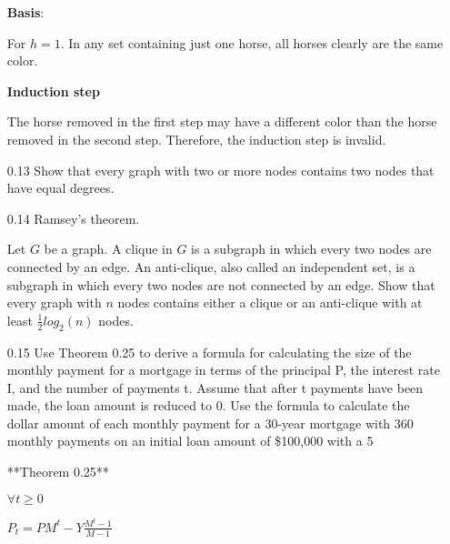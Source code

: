 \documentclass[12pt, a4paper]{article}
\begin{document}
\begin{enumerate}
\textbf{Basis}: 

For $h = 1$. In any set containing just one horse, all horses clearly are the same color.

\textbf{Induction step}

The horse removed in the first step may have a different color than the horse removed in the second step. Therefore, the induction step is invalid.

\item[0.13]
Show that every graph with two or more nodes contains two nodes that have equal degrees.

\item[0.14]
Ramsey's theorem. 

Let $G$ be a graph. A clique in $G$ is a subgraph in which every two nodes are connected by an edge. An anti-clique, also called an independent set, is a subgraph in which every two nodes are not connected by an edge. Show that every graph with $n$ nodes contains either a clique or an anti-clique with at least $\frac{1}{2} log_2(n)$ nodes.


\item[0.15]
Use Theorem 0.25 to derive a formula for calculating the size of the monthly payment for a mortgage in terms of the principal P, the interest rate I, and the number of payments t. Assume that after t payments have been made, the loan amount is reduced to 0. Use the formula to calculate the dollar amount of each monthly payment for a 30-year mortgage with 360 monthly payments on an initial loan amount of \$100,000 with a 5%


**Theorem 0.25**

$\forall t \geq 0$


$P_t=PM^t-Y\frac{M^t-1}{M-1}$
\end{enumerate}
\end{document}
